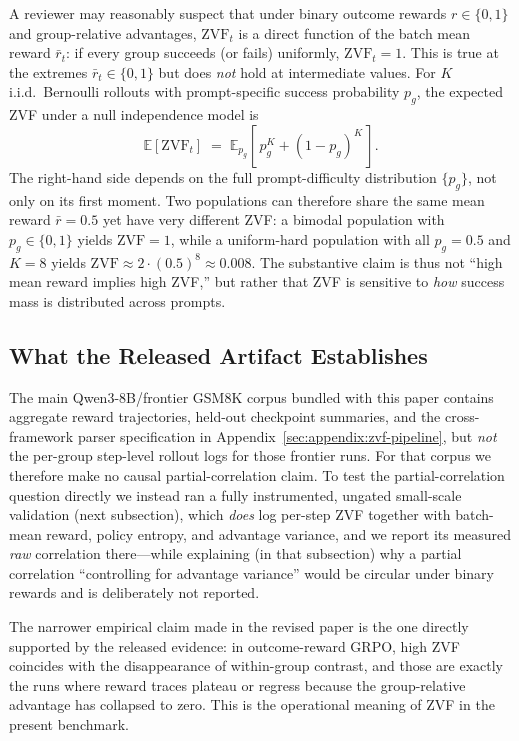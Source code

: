 \documentclass{article}
\begin{document}
A reviewer may reasonably suspect that under binary outcome rewards
$r \in \{0,1\}$ and group-relative advantages, $\mathrm{ZVF}_t$ is a direct
function of the batch mean reward $\bar{r}_t$: if every group succeeds
(or fails) uniformly, $\mathrm{ZVF}_t = 1$. This is true at the extremes
$\bar{r}_t \in \{0,1\}$ but does \emph{not} hold at intermediate values.
For $K$ i.i.d.~Bernoulli rollouts with prompt-specific success probability
$p_g$, the expected ZVF under a null independence model is
\begin{equation}
\mathbb{E}[\mathrm{ZVF}_t] \;=\; \mathbb{E}_{p_g}\!\left[\,p_g^{K} + (1-p_g)^{K}\,\right].
\end{equation}
The right-hand side depends on the full prompt-difficulty distribution
$\{p_g\}$, not only on its first moment. Two populations can therefore
share the same mean reward $\bar r = 0.5$ yet have very different ZVF:
a bimodal population with $p_g \in \{0,1\}$ yields $\mathrm{ZVF}=1$,
while a uniform-hard population with all $p_g = 0.5$ and $K=8$ yields
$\mathrm{ZVF} \approx 2 \cdot (0.5)^8 \approx 0.008$. The substantive
claim is thus not ``high mean reward implies high ZVF,'' but rather that
ZVF is sensitive to \emph{how} success mass is distributed across prompts.

\subsection{What the Released Artifact Establishes}

The main Qwen3-8B/frontier GSM8K corpus bundled with this paper contains
aggregate reward trajectories, held-out checkpoint summaries, and the
cross-framework parser specification in Appendix~\ref{sec:appendix:zvf-pipeline},
but \emph{not} the per-group step-level rollout logs for those frontier runs.
For that corpus we therefore make no causal partial-correlation claim. To test
the partial-correlation question directly we instead ran a fully instrumented,
ungated small-scale validation (next subsection), which \emph{does} log
per-step ZVF together with batch-mean reward, policy entropy, and advantage
variance, and we report its measured \emph{raw} correlation there---while
explaining (in that subsection) why a partial correlation ``controlling for
advantage variance'' would be circular under binary rewards and is deliberately
not reported.

The narrower empirical claim made in the revised paper is the one directly
supported by the released evidence: in outcome-reward GRPO, high ZVF
coincides with the disappearance of within-group contrast, and those are
exactly the runs where reward traces plateau or regress because the
group-relative advantage has collapsed to zero. This is the operational
meaning of ZVF in the present benchmark.
\end{document}
